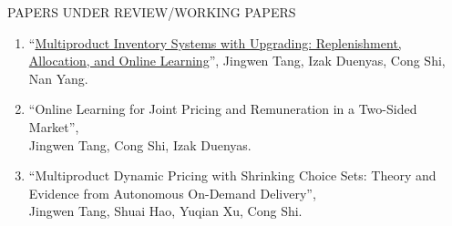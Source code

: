 \documentclass{resume}
\begin{document}
\begin{rSection}{PAPERS UNDER REVIEW/WORKING PAPERS}
\begin{enumerate}

     \item ``\href{https://papers.ssrn.com/sol3/papers.cfm?abstract_id=4781604}{Multiproduct Inventory Systems with Upgrading: Replenishment, Allocation, and Online Learning}'', Jingwen Tang, Izak Duenyas, Cong Shi, Nan Yang.


     

    
  
    \item ``Online Learning for Joint Pricing and Remuneration in a Two-Sided Market'', \\ Jingwen Tang, Cong Shi, Izak Duenyas.
	

  
  \item ``Multiproduct Dynamic Pricing with Shrinking Choice Sets: Theory and Evidence from Autonomous On-Demand Delivery'', \\ Jingwen Tang, Shuai Hao, Yuqian Xu, Cong Shi. 
  
\end{enumerate}
\end{rSection}
\end{document}
